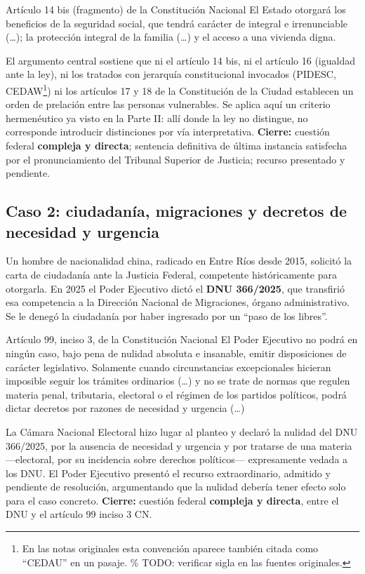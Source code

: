 \documentclass[12pt,oneside]{book}
\begin{document}
\begin{norma}{Artículo 14 bis (fragmento) de la Constitución Nacional}
El Estado otorgará los beneficios de la seguridad social, que tendrá carácter de integral e irrenunciable (\ldots); la protección integral de la familia (\ldots) y el acceso a una vivienda digna.
\end{norma}

El argumento central sostiene que ni el artículo 14 bis, ni el artículo 16 (igualdad ante la ley), ni los tratados con jerarquía constitucional invocados (PIDESC, CEDAW\footnote{En las notas originales esta convención aparece también citada como ``CEDAU'' en un pasaje. \% TODO: verificar sigla en las fuentes originales.}) ni los artículos 17 y 18 de la Constitución de la Ciudad establecen un orden de prelación entre las personas vulnerables. Se aplica aquí un criterio hermenéutico ya visto en la Parte II: allí donde la ley no distingue, no corresponde introducir distinciones por vía interpretativa. \textbf{Cierre:} cuestión federal \textbf{compleja y directa}; sentencia definitiva de última instancia satisfecha por el pronunciamiento del Tribunal Superior de Justicia; recurso presentado y pendiente.

\subsection{Caso 2: ciudadanía, migraciones y decretos de necesidad y urgencia}

Un hombre de nacionalidad china, radicado en Entre Ríos desde 2015, solicitó la carta de ciudadanía ante la Justicia Federal, competente históricamente para otorgarla. En 2025 el Poder Ejecutivo dictó el \textbf{DNU 366/2025}, que transfirió esa competencia a la Dirección Nacional de Migraciones, órgano administrativo. Se le denegó la ciudadanía por haber ingresado por un ``paso de los libres''.

\begin{norma}{Artículo 99, inciso 3, de la Constitución Nacional}
El Poder Ejecutivo no podrá en ningún caso, bajo pena de nulidad absoluta e insanable, emitir disposiciones de carácter legislativo. Solamente cuando circunstancias excepcionales hicieran imposible seguir los trámites ordinarios (\ldots) y no se trate de normas que regulen materia penal, tributaria, electoral o el régimen de los partidos políticos, podrá dictar decretos por razones de necesidad y urgencia (\ldots)
\end{norma}

La Cámara Nacional Electoral hizo lugar al planteo y declaró la nulidad del DNU 366/2025, por la ausencia de necesidad y urgencia y por tratarse de una materia ---electoral, por su incidencia sobre derechos políticos--- expresamente vedada a los DNU. El Poder Ejecutivo presentó el recurso extraordinario, admitido y pendiente de resolución, argumentando que la nulidad debería tener efecto solo para el caso concreto. \textbf{Cierre:} cuestión federal \textbf{compleja y directa}, entre el DNU y el artículo 99 inciso 3 CN.
\end{document}

